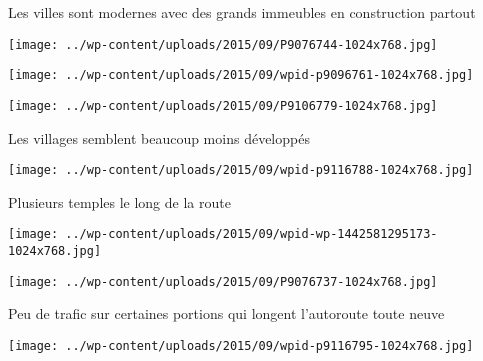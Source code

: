 

 Les villes sont modernes avec des grands immeubles en construction partout 

 

\begin{center} \texttt{[image: ../wp-content/uploads/2015/09/P9076744-1024x768.jpg]} \end{center}

 

 

\begin{center} \texttt{[image: ../wp-content/uploads/2015/09/wpid-p9096761-1024x768.jpg]} \end{center}

 

 

\begin{center} \texttt{[image: ../wp-content/uploads/2015/09/P9106779-1024x768.jpg]} \end{center}

 

 Les villages semblent beaucoup moins développés 

 

\begin{center} \texttt{[image: ../wp-content/uploads/2015/09/wpid-p9116788-1024x768.jpg]} \end{center}

 

 Plusieurs temples le long de la route 

 

\begin{center} \texttt{[image: ../wp-content/uploads/2015/09/wpid-wp-1442581295173-1024x768.jpg]} \end{center}

 

 

\begin{center} \texttt{[image: ../wp-content/uploads/2015/09/P9076737-1024x768.jpg]} \end{center}

 

 Peu de trafic sur certaines portions qui longent l'autoroute toute neuve 

 

\begin{center} \texttt{[image: ../wp-content/uploads/2015/09/wpid-p9116795-1024x768.jpg]} \end{center}

